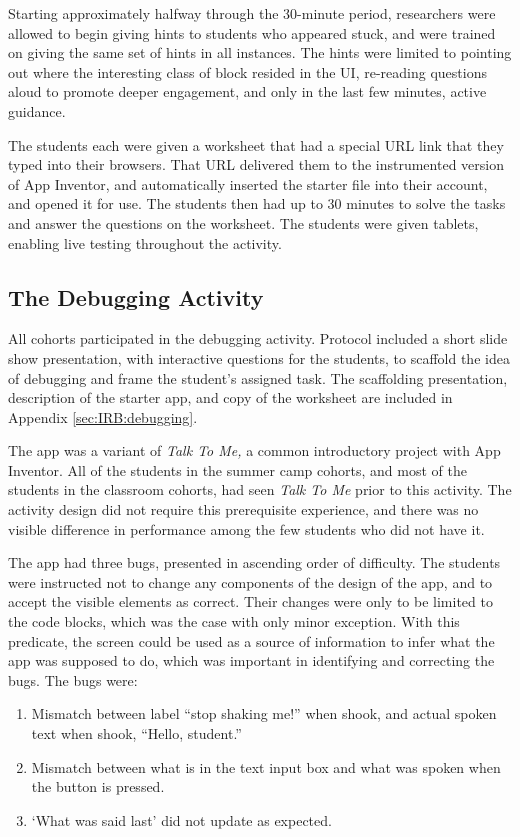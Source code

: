 Starting approximately halfway through the 30-minute period, researchers were allowed to begin giving hints to students who appeared stuck, and were trained on giving the same set of hints in all instances. The hints were limited to pointing out where the interesting class of block resided in the UI, re-reading questions aloud to promote deeper engagement, and only in the last few minutes, active guidance. 

The students each were given a worksheet that had a special URL link that they typed into their browsers. That URL delivered them to the instrumented version of App Inventor, and automatically inserted the starter file into their account, and opened it for use. The students then had up to 30 minutes to solve the tasks and answer the questions on the worksheet. The students were given tablets, enabling live testing throughout the activity. 


\subsection{The Debugging Activity}
All cohorts participated in the debugging activity. Protocol included a short slide show presentation, with interactive questions for the students, to scaffold the idea of debugging and frame the student's assigned task. The scaffolding presentation, description of the starter app, and copy of the worksheet are included in Appendix \ref{sec:IRB:debugging}.

The app was a variant of \emph{Talk To Me,} a common introductory project with App Inventor. All of the students in the summer camp cohorts, and most of the students in the classroom cohorts, had seen \emph{Talk To Me} prior to this activity. The activity design did not require this prerequisite experience, and there was no visible difference in performance among the few students who did not have it. 

The app had three bugs, presented in ascending order of difficulty. The students were instructed not to change any components of the design of the app, and to accept the visible elements as correct. Their changes were only to be limited to the code blocks, which was the case with only minor exception. With this predicate, the screen could be used as a source of information to infer what the app was supposed to do, which was important in identifying and correcting the bugs. The bugs were:

\begin{enumerate}
\item Mismatch between label ``stop shaking me!'' when shook, and actual spoken text when shook, ``Hello, student.''
\item Mismatch between what is in the text input box and what was spoken when the button is pressed.
\item `What was said last' did not update as expected.
\end{enumerate}

